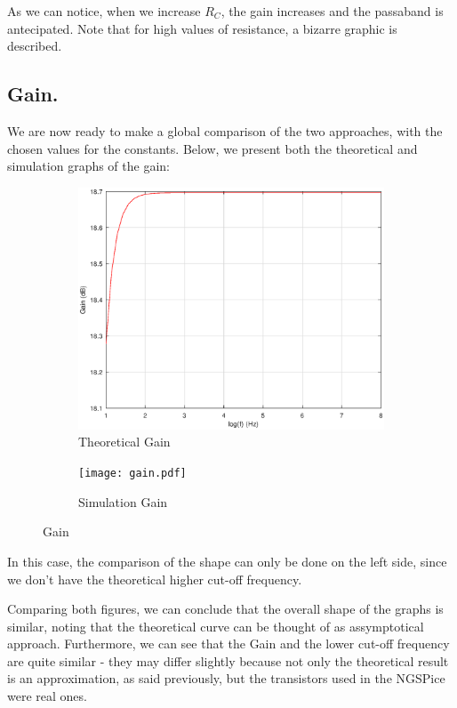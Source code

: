 As we can notice, when we increase $R_C$, the gain increases and the passaband is antecipated. Note that for high values of resistance, a bizarre graphic is described. 

\subsection{Gain.}
\pagebreak

We are now ready to make a global comparison of the two approaches, with the chosen values for the constants. Below, we present both the theoretical and simulation graphs of the gain:

\vspace{-2.5cm}

\begin{figure}[h]
\centering
\begin{subfigure}{.5\textwidth}
    \centering
    \vspace{2.8 cm}
    \includegraphics[scale=0.4]{Gain.eps}
    \caption{Theoretical Gain}
\end{subfigure}%
\begin{subfigure}{.5\textwidth}
    \centering
    \texttt{[image: gain.pdf]}
    \caption{Simulation Gain}
\end{subfigure}
\caption{Gain}
\label{fig:Gain}
\end{figure}

In this case, the comparison of the shape can only be done on the left side, since we don't have the theoretical higher cut-off frequency. 

Comparing both figures, we can conclude that the overall shape of the graphs is similar, noting that the theoretical curve can be thought of as assymptotical approach. Furthermore, we can see that the Gain and the lower cut-off frequency are quite similar - they may differ slightly because not only the theoretical result is an approximation, as said previously, but the transistors used in the NGSPice were real ones.


